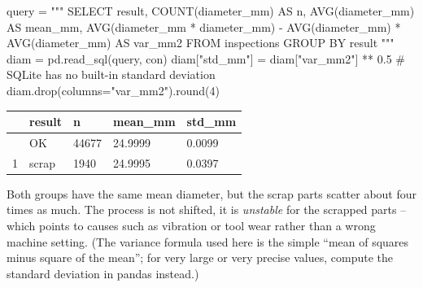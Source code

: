 \documentclass[
  letterpaper,
  DIV=11,
  numbers=noendperiod]{scrreprt}
\newenvironment{Shaded}{\begin{snugshade}}{\end{snugshade}}
\newcommand{\BuiltInTok}[1]{\textcolor[rgb]{0.00,0.23,0.31}{#1}}
\newcommand{\CommentTok}[1]{\textcolor[rgb]{0.37,0.37,0.37}{#1}}
\newcommand{\DecValTok}[1]{\textcolor[rgb]{0.68,0.00,0.00}{#1}}
\newcommand{\FloatTok}[1]{\textcolor[rgb]{0.68,0.00,0.00}{#1}}
\newcommand{\NormalTok}[1]{\textcolor[rgb]{0.00,0.23,0.31}{#1}}
\newcommand{\OperatorTok}[1]{\textcolor[rgb]{0.37,0.37,0.37}{#1}}
\newcommand{\StringTok}[1]{\textcolor[rgb]{0.13,0.47,0.30}{#1}}
\begin{document}
\begin{tcolorbox}[enhanced jigsaw, left=2mm, title=\textcolor{quarto-callout-caution-color}{\faFire}\hspace{0.5em}{Solution to Exercise 3}, opacityback=0, breakable, rightrule=.15mm, arc=.35mm, toptitle=1mm, colbacktitle=quarto-callout-caution-color!10!white, opacitybacktitle=0.6, coltitle=black, colframe=quarto-callout-caution-color-frame, bottomrule=.15mm, leftrule=.75mm, bottomtitle=1mm, titlerule=0mm, toprule=.15mm, colback=white]

\begin{Shaded}
\begin{Highlighting}[]
\NormalTok{query }\OperatorTok{=} \StringTok{"""}
\StringTok{SELECT result, COUNT(diameter\_mm) AS n, AVG(diameter\_mm) AS mean\_mm,}
\StringTok{       AVG(diameter\_mm * diameter\_mm) {-} AVG(diameter\_mm) * AVG(diameter\_mm) AS var\_mm2}
\StringTok{FROM inspections}
\StringTok{GROUP BY result}
\StringTok{"""}
\NormalTok{diam }\OperatorTok{=}\NormalTok{ pd.read\_sql(query, con)}
\NormalTok{diam[}\StringTok{"std\_mm"}\NormalTok{] }\OperatorTok{=}\NormalTok{ diam[}\StringTok{"var\_mm2"}\NormalTok{] }\OperatorTok{**} \FloatTok{0.5}        \CommentTok{\# SQLite has no built{-}in standard deviation}
\NormalTok{diam.drop(columns}\OperatorTok{=}\StringTok{"var\_mm2"}\NormalTok{).}\BuiltInTok{round}\NormalTok{(}\DecValTok{4}\NormalTok{)}
\end{Highlighting}
\end{Shaded}

\begin{longtable}[]{@{}lllll@{}}
\toprule\noalign{}
& result & n & mean\_mm & std\_mm \\
\midrule\noalign{}
\endhead
\bottomrule\noalign{}
\endlastfoot
0 & OK & 44677 & 24.9999 & 0.0099 \\
1 & scrap & 1940 & 24.9995 & 0.0397 \\
\end{longtable}

Both groups have the same mean diameter, but the scrap parts scatter
about four times as much. The process is not shifted, it is
\emph{unstable} for the scrapped parts -- which points to causes such as
vibration or tool wear rather than a wrong machine setting. (The
variance formula used here is the simple ``mean of squares minus square
of the mean''; for very large or very precise values, compute the
standard deviation in pandas instead.)

\end{tcolorbox}
\end{document}
